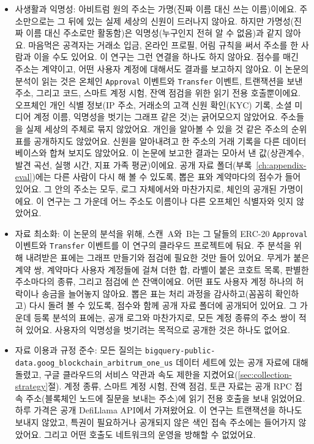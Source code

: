 \begin{itemize}
\item{}\label{sub:privacy-anonymity}
  사생활과 익명성: 아비트럼 원의 주소는 가명(진짜 이름 대신 쓰는 이름)이에요. 주소만으로는 그 뒤에 있는 실제 세상의 신원이 드러나지 않아요\parencite{packin2024credit}. 하지만 가명성(진짜 이름 대신 주소로만 활동함)은 익명성(누구인지 전혀 알 수 없음)과 같지 않아요. 마음먹은 공격자는 거래소 입금, 온라인 프로필, 어림 규칙을 써서 주소를 한 사람과 이을 수도 있어요. 이 연구는 그런 연결을 하나도 하지 않아요. 점수를 매긴 주소는 계약이고, 어떤 사용자 계정에 대해서도 결과를 보고하지 않아요. 이 논문의 분석이 읽는 것은 온체인 \texttt{Approval} 이벤트와 \texttt{Transfer} 이벤트, 트랜잭션을 보낸 주소, 그리고 코드, 스마트 계정 시험, 잔액 점검을 위한 읽기 전용 호출뿐이에요. 오프체인 개인 식별 정보(IP 주소, 거래소의 고객 신원 확인(KYC) 기록, 소셜 미디어 계정 이름, 익명성을 벗기는 그래프 같은 것)는 긁어모으지 않았어요. 주소들을 실제 세상의 주체로 묶지 않았어요. 개인을 알아볼 수 있을 것 같은 주소의 순위표를 공개하지도 않았어요. 신원을 알아내려고 한 주소의 거래 기록을 다른 데이터베이스와 합쳐 보지도 않았어요. 이 논문에 보고한 결과는 모아서 낸 값(상관계수, 발견 곡선, 실행 시간, 지표 가족 평균)이에요. 공개 자료 폴더(부록~\ref{ch:appendix-eval})에는 다른 사람이 다시 해 볼 수 있도록, 뽑은 표와 계약마다의 점수가 들어 있어요. 그 안의 주소는 모두, 로그 자체에서와 마찬가지로, 체인의 공개된 가명이에요. 이 연구는 그 가운데 어느 주소도 이름이나 다른 오프체인 식별자와 잇지 않았어요.

\item{}\label{sub:data-minimization}
  자료 최소화: 이 논문의 분석을 위해, 스캔~A와~B는 그 달들의 ERC-20 \texttt{Approval} 이벤트와 \texttt{Transfer} 이벤트를 이 연구의 클라우드 프로젝트에 둬요. 주 분석을 위해 내려받은 표에는 그래프 만들기와 점검에 필요한 것만 들어 있어요. 무게가 붙은 계약 쌍, 계약마다 사용자 계정들에 걸쳐 더한 합, 라벨이 붙은 코호트 목록, 판별한 주소마다의 종류, 그리고 점검에 쓴 잔액이에요. 어떤 표도 사용자 계정 하나의 허락이나 송금을 늘어놓지 않아요. 뽑은 표는 처리 과정을 감사하고(꼼꼼히 확인하고) 다시 돌려 볼 수 있도록, 점수와 함께 공개 자료 폴더에 공개되어 있어요. 그 가운데 등록 분석의 표에는, 공개 로그와 마찬가지로, 모든 계정 종류의 주소 쌍이 적혀 있어요. 사용자의 익명성을 벗기려는 목적으로 공개한 것은 하나도 없어요.

\item{}\label{sub:data-usage-compliance}
  자료 이용과 규정 준수: 모든 질의는 \texttt{bigquery-public-data.goog\_blockchain\_arbitrum\_one\_us} 데이터 세트에 있는 공개 자료에 대해 돌렸고, 구글 클라우드의 서비스 약관과 속도 제한을 지켰어요(\ref{sec:collection-strategy}절). 계정 종류, 스마트 계정 시험, 잔액 점검, 토큰 자료는 공개 RPC 접속 주소(블록체인 노드에 질문을 보내는 주소)에 읽기 전용 호출을 보내 읽었어요. 하루 가격은 공개 DefiLlama API에서 가져왔어요. 이 연구는 트랜잭션을 하나도 보내지 않았고, 특권이 필요하거나 공개되지 않은 색인 접속 주소에는 들어가지 않았어요. 그리고 어떤 호출도 네트워크의 운영을 방해할 수 없었어요.


\end{itemize}

